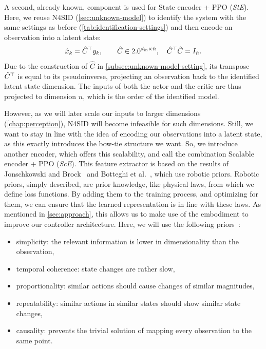 A second, already known, component is used for State encoder + PPO (\emph{StE}).
Here, we reuse N4SID (\cref{sec:unknown-model}) to identify the system with the same settings as before (\cref{tab:identification-settings})
and then encode an observation into a latent state:
\begin{equation}
    \label{eq:state-encoder}
    \hat{x}_k = \hat{C}^{\top} y_k , \qquad \hat{C} \in 2.0^{d_{\mathrm{in}} \times \hat{n}} , \quad \hat{C}^{\top} \hat{C} = I_{\hat{n}} .
\end{equation}
Due to the construction of $\hat{C}$ in \cref{subsec:unknown-model-setting}, its transpose
$\hat{C}^{\top}$ is equal to its pseudoinverse, projecting an observation back to the identified
latent state dimension. The inputs of both the actor and the critic are thus projected to dimension $\hat{n}$,
which is the order of the identified model.

However, as we will later scale our inputs to larger dimensions (\cref{chap:perception}), N4SID will become infeasible for such dimensions.
Still, we want to stay in line with the idea of encoding our observations into a latent state, as this exactly introduces the bow-tie structure
we want. So, we introduce another encoder, which offers this scalability, and call the combination Scalable encoder + PPO (\emph{ScE}). This feature extractor
is based on the results of Jonschkowski and Brock~\cite{Jonschkowski2015Learning} and Botteghi et al.~\cite{Botteghi2021LowDimensional}, which use robotic priors. Robotic priors, simply described,
are prior knowledge, like physical laws, from which we define loss functions. By adding them to the training process, and optimizing for them, we can
ensure that the learned representation is in line with these laws. As mentioned in \cref{sec:approach}, this allows us to make use of the embodiment
to improve our controller architecture. Here, we will use the following priors~\cite[Sec.~IV-B]{Botteghi2021LowDimensional}:
\begin{itemize}
    \item simplicity: the relevant information is lower in dimensionality than the observation,
    \item temporal coherence: state changes are rather slow,
    \item proportionality: similar actions should cause changes of similar magnitudes,
    \item repeatability: similar actions in similar states should show similar state changes,
    \item causality: prevents the trivial solution of mapping every observation to the same point.
\end{itemize}

